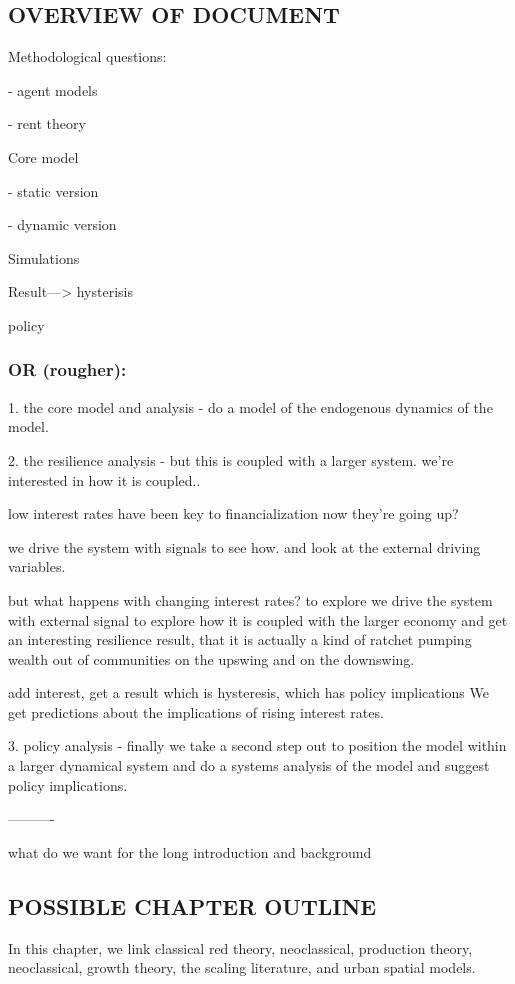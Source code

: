 \subsection{OVERVIEW OF DOCUMENT}

Methodological questions: 

    - agent models 
    
    - rent theory

Core model

    - static version
    
    - dynamic version

Simulations

Result---> hysterisis

policy

\subsubsection{OR (rougher):}

1. the core model and analysis - do a model of the endogenous dynamics of the model.

2. the resilience analysis -
but this is coupled with a larger system. we're interested in how it is coupled..

low interest rates have been key to financialization 
now they're going up?

we drive the system with signals to see how. and look at the external driving variables.

but what happens with changing interest rates? to explore we drive the system with external signal to explore how it is coupled with the larger economy and get an interesting resilience result, that it is actually a kind of ratchet pumping wealth out of communities on the upswing and on the downswing.

add interest, get a result which is hysteresis, which has policy implications
We get predictions about the implications of rising interest rates.

3.  policy analysis - finally we take a second step out to position the model within a larger dynamical system and do a systems analysis of the model and suggest policy implications. 

----------

what do we want for the long introduction and background


\color{red}
\subsection{POSSIBLE CHAPTER OUTLINE}
In this chapter, we link classical red theory, neoclassical, production theory, neoclassical, growth theory, the scaling literature,  and urban spatial models. 

